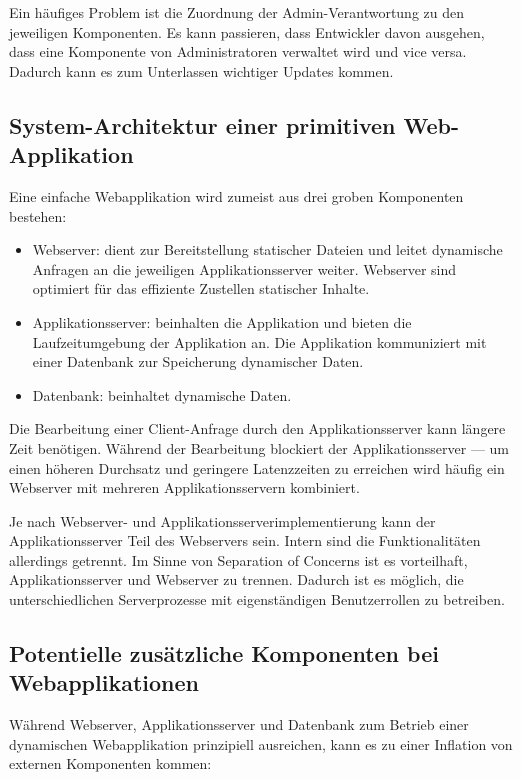 Ein häufiges Problem ist die Zuordnung der Admin-Verantwortung zu den jeweiligen Komponenten. Es kann passieren, dass Entwickler davon ausgehen, dass eine Komponente von Administratoren verwaltet wird und vice versa. Dadurch kann es zum Unterlassen wichtiger Updates kommen.

\subsection{System-Architektur einer primitiven Web-Applikation}

Eine einfache Webapplikation wird zumeist aus drei groben Komponenten bestehen:

\begin{itemize}
	\item Webserver: dient zur Bereitstellung statischer Dateien und leitet dynamische Anfragen an die jeweiligen Applikationsserver weiter. Webserver sind optimiert für das effiziente Zustellen statischer Inhalte.
	\item Applikationsserver: beinhalten die Applikation und bieten die Laufzeitumgebung der Applikation an. Die Applikation kommuniziert mit einer Datenbank zur Speicherung dynamischer Daten.
	\item Datenbank: beinhaltet dynamische Daten.
\end{itemize}

Die Bearbeitung einer Client-Anfrage durch den Applikationsserver kann längere Zeit benötigen. Während der Bearbeitung blockiert der Applikationsserver --- um einen höheren Durchsatz und geringere Latenzzeiten zu erreichen wird häufig ein Webserver mit mehreren Applikationsservern kombiniert.

Je nach Webserver- und Applikationsserverimplementierung kann der Applikationsserver Teil des Webservers sein. Intern sind die Funktionalitäten allerdings getrennt. Im Sinne von Separation of Concerns ist es vorteilhaft, Applikationsserver und Webserver zu trennen. Dadurch ist es möglich, die unterschiedlichen Serverprozesse mit eigenständigen Benutzerrollen zu betreiben.

\subsection{Potentielle zusätzliche Komponenten bei Webapplikationen}

Während Webserver, Applikationsserver und Datenbank zum Betrieb einer dynamischen Webapplikation prinzipiell ausreichen, kann es zu einer Inflation von externen Komponenten kommen:

